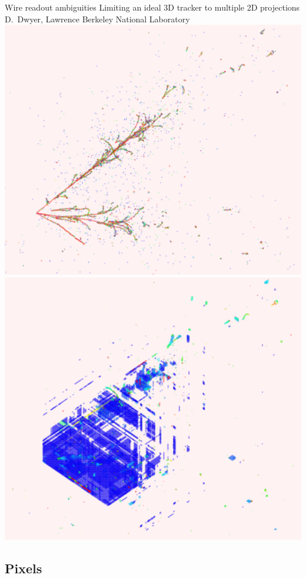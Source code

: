 \documentclass[]{beamer}
\newcommand*{\emphcoltitle}{blue}
\begin{document}
\begin{frame}{Wire readout ambiguities}{\color{\emphcoltitle} Limiting an ideal 3D tracker to multiple 2D projections}
	{\tiny D.\ Dwyer, Lawrence Berkeley National Laboratory}\\
	\centering
	\includegraphics[height=.6\textheight]{defence/nuecctru}
	\includegraphics[height=.6\textheight]{defence/nueccamb}
\end{frame}

\subsection{Pixels}
\end{document}
